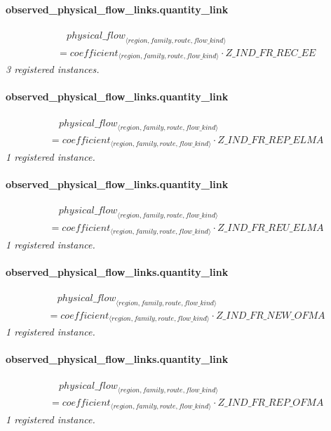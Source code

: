 \documentclass[11pt]{article}
\begin{document}
\paragraph{observed\_physical\_flow\_links.quantity\_link}
\begin{align*}
&\quad {physical\_flow}_{\langle region, family, route, flow\_kind\rangle}\\
&= coefficient_{\langle region, family, route, flow\_kind\rangle} \cdot Z\_IND\_FR\_REC\_EE
\end{align*}
\noindent\emph{3 registered instances.}\par
\paragraph{observed\_physical\_flow\_links.quantity\_link}
\begin{align*}
&\quad {physical\_flow}_{\langle region, family, route, flow\_kind\rangle}\\
&= coefficient_{\langle region, family, route, flow\_kind\rangle} \cdot Z\_IND\_FR\_REP\_ELMA
\end{align*}
\noindent\emph{1 registered instance.}\par
\paragraph{observed\_physical\_flow\_links.quantity\_link}
\begin{align*}
&\quad {physical\_flow}_{\langle region, family, route, flow\_kind\rangle}\\
&= coefficient_{\langle region, family, route, flow\_kind\rangle} \cdot Z\_IND\_FR\_REU\_ELMA
\end{align*}
\noindent\emph{1 registered instance.}\par
\paragraph{observed\_physical\_flow\_links.quantity\_link}
\begin{align*}
&\quad {physical\_flow}_{\langle region, family, route, flow\_kind\rangle}\\
&= coefficient_{\langle region, family, route, flow\_kind\rangle} \cdot Z\_IND\_FR\_NEW\_OFMA
\end{align*}
\noindent\emph{1 registered instance.}\par
\paragraph{observed\_physical\_flow\_links.quantity\_link}
\begin{align*}
&\quad {physical\_flow}_{\langle region, family, route, flow\_kind\rangle}\\
&= coefficient_{\langle region, family, route, flow\_kind\rangle} \cdot Z\_IND\_FR\_REP\_OFMA
\end{align*}
\noindent\emph{1 registered instance.}\par
\end{document}
